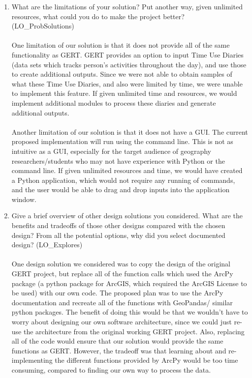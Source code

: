 \documentclass[12pt, titlepage]{article}
\begin{document}
\begin{enumerate}
  \item What are the limitations of your solution?  Put another way, given
  unlimited resources, what could you do to make the project better? (LO\_ProbSolutions)
  \\
  \\
  One limitation of our solution is that it does not provide all of the same functionality as GERT. GERT provides an option to input Time Use Diaries (data sets which tracks person's activities throughout the day), and use those to create additional outputs. Since we were not able to obtain samples of what these Time Use Diaries, and also were limited by time, we were unable to implement this feature. If given unlimited time and resources, we would implement additional modules to process these diaries and generate additional outputs.
  \\
  \\
  Another limitation of our solution is that it does not have a GUI. The current proposed implementation will run using the command line. This is not as intuitive as a GUI, especially for the target audience of geography researchers/students who may not have experience with Python or the command line. If given unlimited resources and time, we would have created a Python application, which would not require any running of commands, and the user would be able to drag and drop inputs into the application window.
  
  
  \item Give a brief overview of other design solutions you considered.  What
  are the benefits and tradeoffs of those other designs compared with the chosen
  design?  From all the potential options, why did you select documented design? (LO\_Explores)
  \\
  \\
  One design solution we considered was to copy the design of the original GERT project, but replace all of the function calls which used the ArcPy package (a python package for ArcGIS, which required the ArcGIS License to be used) with our own code. The proposed plan was to use the ArcPy documentation and recreate all of the functions with GeoPandas/ similar python packages. The benefit of doing this would be that we wouldn't have to worry about designing our own software architecture, since we could just re-use the architecture from the original working GERT project. Also, replacing all of the code would ensure that our solution would provide the same functions as GERT. However, the tradeoff was that learning about and re-implementing the different functions provided by ArcPy would be too time consuming, compared to finding our own way to process the data.


\end{enumerate}
\end{document}
